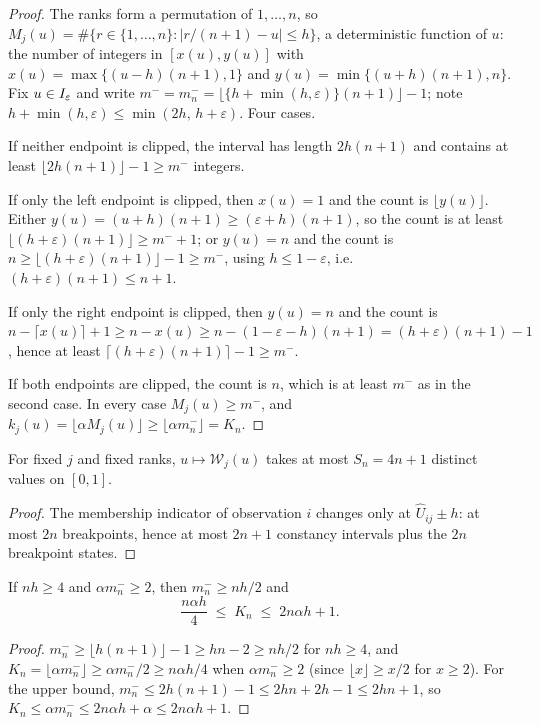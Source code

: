\begin{proof}
The ranks form a permutation of $1,\ldots,n$, so
$M_j(u)=\#\{r\in\{1,\ldots,n\}:|r/(n+1)-u|\le h\}$, a deterministic
function of $u$: the number of integers in
$[x(u),y(u)]$ with $x(u)=\max\{(u-h)(n+1),1\}$ and
$y(u)=\min\{(u+h)(n+1),n\}$.  Fix $u\in I_\varepsilon$ and write
$m^-=m_n^-=\lfloor\{h+\min(h,\varepsilon)\}(n+1)\rfloor-1$; note
$h+\min(h,\varepsilon)\le\min(2h,\,h+\varepsilon)$.  Four cases.

If neither endpoint is clipped, the interval has length $2h(n+1)$ and
contains at least $\lfloor2h(n+1)\rfloor-1\ge m^-$ integers.

If only the left endpoint is clipped, then $x(u)=1$ and the count is
$\lfloor y(u)\rfloor$.  Either $y(u)=(u+h)(n+1)\ge(\varepsilon+h)(n+1)$,
so the count is at least
$\lfloor(h+\varepsilon)(n+1)\rfloor\ge m^-+1$; or $y(u)=n$ and the count
is $n\ge\lfloor(h+\varepsilon)(n+1)\rfloor-1\ge m^-$, using
$h\le1-\varepsilon$, i.e.\ $(h+\varepsilon)(n+1)\le n+1$.

If only the right endpoint is clipped, then $y(u)=n$ and the count is
$n-\lceil x(u)\rceil+1\ge n-x(u)\ge n-(1-\varepsilon-h)(n+1)
=(h+\varepsilon)(n+1)-1$, hence at least
$\lceil(h+\varepsilon)(n+1)\rceil-1\ge m^-$.

If both endpoints are clipped, the count is $n$, which is at least
$m^-$ as in the second case.  In every case $M_j(u)\ge m^-$, and
$k_j(u)=\lfloor\alpha M_j(u)\rfloor\ge\lfloor\alpha m_n^-\rfloor=K_n$.
\end{proof}

\begin{lemma}\label{lem:app-states}
For fixed $j$ and fixed ranks, $u\mapsto\mathcal W_j(u)$ takes at most
$S_n=4n+1$ distinct values on $[0,1]$.
\end{lemma}

\begin{proof}
The membership indicator of observation $i$ changes only at
$\widehat U_{ij}\pm h$: at most $2n$ breakpoints, hence at most $2n+1$
constancy intervals plus the $2n$ breakpoint states.
\end{proof}

\begin{lemma}\label{lem:app-kn}
If $nh\ge4$ and $\alpha m_n^-\ge2$, then $m_n^-\ge nh/2$ and
\[
 \frac{n\alpha h}{4}\;\le\;K_n\;\le\;2n\alpha h+1 .
\]
\end{lemma}

\begin{proof}
$m_n^-\ge\lfloor h(n+1)\rfloor-1\ge h n-2\ge nh/2$ for $nh\ge4$, and
$K_n=\lfloor\alpha m_n^-\rfloor\ge\alpha m_n^-/2\ge n\alpha h/4$ when
$\alpha m_n^-\ge2$ (since $\lfloor x\rfloor\ge x/2$ for $x\ge2$).  For the upper bound, $m_n^-\le2h(n+1)-1\le2hn+2h-1\le2hn+1$, so
$K_n\le\alpha m_n^-\le2n\alpha h+\alpha\le2n\alpha h+1$.
\end{proof}

